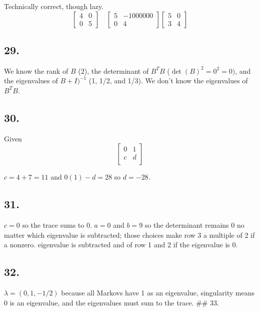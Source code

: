 \documentclass[
]{article}
\begin{document}
Technically correct, though lazy. \[
 \begin{bmatrix}
  4 & 0\\
  0 & 5
\end{bmatrix} \quad
\begin{bmatrix}
  5 & -1000000\\
  0 & 4
\end{bmatrix}
\begin{bmatrix}
  5 & 0\\
  3 & 4
\end{bmatrix}
\]

\hypertarget{section-26}{%
\subsection{29.}\label{section-26}}

We know the rank of \(B\) (2), the determinant of \(B^TB\)
(\(\det(B)^2 = 0^2 =0)\), and the eigenvalues of \(B + I)^{-1}\) (1,
1/2, and 1/3). We don't know the eigenvalues of \(B^TB\).

\hypertarget{section-27}{%
\subsection{30.}\label{section-27}}

Given \[\begin{bmatrix}
  0 & 1\\
  c & d\\
\end{bmatrix}\]

\(c = 4+7 = 11\) and \(0(1) -d=28\) so \(d =-28\).

\hypertarget{section-28}{%
\subsection{31.}\label{section-28}}

\(c=0\) so the trace sums to 0. \(a = 0\) and \(b=9\) so the determinant
remains 0 no matter which eigenvalue is subtracted; those choices make
row 3 a multiple of 2 if a nonzero. eigenvalue is subtracted and of row
1 and 2 if the eigenvalue is 0.

\hypertarget{section-29}{%
\subsection{32.}\label{section-29}}

\(\lambda = (0, 1, -1/2)\) because all Markovs have 1 as an eigenvalue,
singularity means 0 is an eigenvalue, and the eigenvalues must sum to
the trace. \#\# 33.
\end{document}

